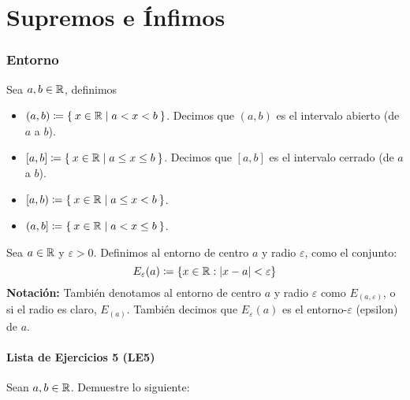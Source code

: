 \part*{Supremos e Ínfimos}

\section*{Entorno}

  Sea $a, b\in \mathbb{R}$, definimos
\begin{itemize}
 \item $(a,b)\coloneqq \Set{x\in \mathbb{R}| a<x<b}$. Decimos que $(a,b)$ es el intervalo abierto (de $a$ a $b$).
 \item $[a,b]\coloneqq \Set{x\in \mathbb{R}|a\leq x\leq b}$. Decimos que $[a, b]$ es el intervalo cerrado (de $a$ a $b$).
 \item $[a,b)\coloneqq \Set{x\in \mathbb{R}|a\leq x <b}$.
 \item $(a,b]\coloneqq \Set{x\in \mathbb{R}|a<x\leq b}$.
\end{itemize}

 Sea $a \in \mathbb{R}$ y $\varepsilon>0$. Definimos al entorno de centro $a$ y radio $\varepsilon$, como el conjunto: \[E_\varepsilon(a)\coloneqq \{ x\in \mathbb{R}: |x-a|<\varepsilon\}\]
\textbf{Notación:} También denotamos al entorno de centro $a$ y radio $\varepsilon$ como $E_{(a, \varepsilon)}$, o si el radio es claro, $E_{(a)}$. También decimos que $E_\varepsilon(a)$ es el entorno-$\varepsilon$ (epsilon) de $a$.

\subsection*{Lista de Ejercicios 5 (LE5)}

Sean $a,b \in \mathbb{R}$. Demuestre lo siguiente:

